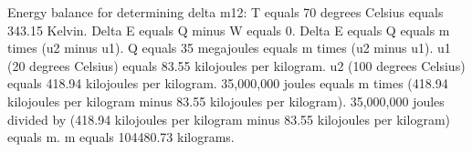 Energy balance for determining delta m12:  
T equals 70 degrees Celsius equals 343.15 Kelvin.  
Delta E equals Q minus W equals 0.  
Delta E equals Q equals m times (u2 minus u1).  
Q equals 35 megajoules equals m times (u2 minus u1).  
u1 (20 degrees Celsius) equals 83.55 kilojoules per kilogram.  
u2 (100 degrees Celsius) equals 418.94 kilojoules per kilogram.  
35,000,000 joules equals m times (418.94 kilojoules per kilogram minus 83.55 kilojoules per kilogram).  
35,000,000 joules divided by (418.94 kilojoules per kilogram minus 83.55 kilojoules per kilogram) equals m.  
m equals 104480.73 kilograms.